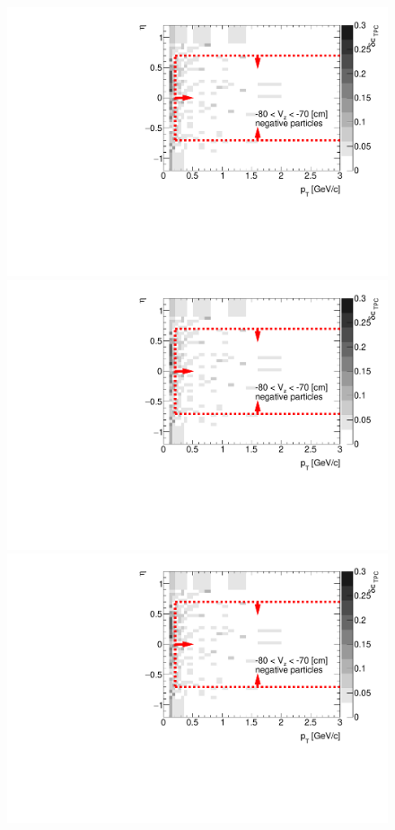 \begin{figure}[H]
{	}~
	\parbox{0.325\textwidth}{
		\includegraphics[width=\linewidth,page=2]{graphics/systematicsEfficiency/deadMaterial/secondaries_Unbinned_Charged_SD.pdf}\\
		\includegraphics[width=\linewidth,page=5]{graphics/systematicsEfficiency/deadMaterial/secondaries_Unbinned_Charged_SD.pdf}\\
		\includegraphics[width=\linewidth,page=8]{graphics/systematicsEfficiency/deadMaterial/secondaries_Unbinned_Charged_SD.pdf}\\
}
\end{figure}

